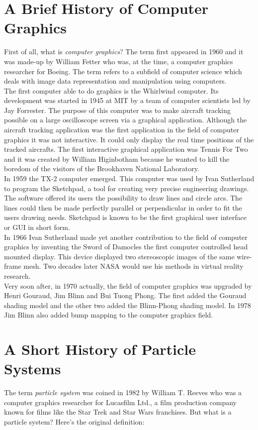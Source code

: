 \section{A Brief History of Computer Graphics}
First of all, what is \textit{computer graphics}? The term first appeared in 1960 and it was made-up by William Fetter who was, at the time, a computer graphics researcher for Boeing. The term refers to a subfield of computer science which deals with image data representation and manipulation using computers.\\

The first computer able to do graphics is the Whirlwind computer. Its development was started in 1945 at MIT by a team of computer scientists led by Jay Forrester. The purpose of this computer was to make aircraft tracking possible on a large oscilloscope screen via a graphical application. Although the aircraft tracking application was the first application in the field of computer graphics it was not interactive. It could only display the real time positions of the tracked aircrafts. The first interactive graphical application was Tennis For Two and it was created by William Higinbotham because he wanted to kill the boredom of the visitors of the Brookhaven National Laboratory.\\

In 1959 the TX-2 computer emerged. This computer was used by Ivan Sutherland to program the Sketchpad, a tool for creating very precise engineering drawings. The software offered its users the possibility to draw lines and circle arcs. The lines could then be made perfectly parallel or perpendicular in order to fit the users drawing needs. Sketchpad is known to be the first graphical user interface or GUI in short form.\\

In 1966 Ivan Sutherland made yet another contribution to the field of computer graphics by inventing the Sword of Damocles the first computer controlled head mounted display. This device displayed two stereoscopic images of the same wire-frame mesh. Two decades later NASA would use his methods in virtual reality research.\\

Very soon after, in 1970 actually, the field of computer graphics was upgraded by Henri Gouraud, Jim Blinn and Bui Tuong Phong. The first added the Gouraud shading model and the other two added the Blinn-Phong shading model. In 1978 Jim Blinn also added bump mapping to the computer graphics field.
\section{A Short History of Particle Systems}
The term \textit{particle system} was coined in 1982 by William T. Reeves who was a computer graphics researcher for Lucasfilm Ltd., a film production company known for films like the Star Trek and Star Wars franchises. But what is a particle system? Here's the original definition:\\

